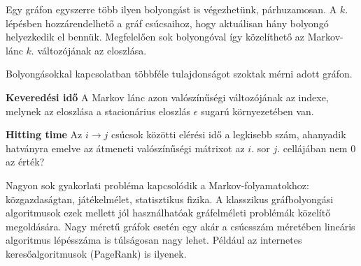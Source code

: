 Egy gráfon egyszerre több ilyen bolyongást is végezhetünk, párhuzamosan. A
$k.$ lépésben hozzárendelhető a gráf csúcsaihoz, hogy aktuálisan hány bolyongó
helyezkedik el bennük. Megfelelően sok bolyongóval így közelíthető az Markov-lánc
$k.$ változójának az eloszlása.

Bolyongásokkal kapcsolatban többféle tulajdonságot szoktak mérni adott gráfon.

\textbf{Keveredési idő} A Markov lánc azon valószínűségi változójának
az indexe, melynek az eloszlása a stacionárius eloszlás $\epsilon$ sugarú környezetében
van.

\textbf{Hitting time} Az $i \rightarrow j$ csúcsok
közötti elérési idő a legkisebb szám, ahanyadik hatványra emelve az
átmeneti valószínűségi mátrixot az $i.$ sor $j.$ cellájában nem 0 az érték?

Nagyon sok gyakorlati probléma kapcsolódik a Markov-folyamatokhoz:
közgazdaságtan, játékelmélet, statisztikus fizika. A klasszikus gráfbolyongási
algoritmusok ezek mellett jól használhatóak gráfelméleti problémák közelítő
megoldására. Nagy méretű gráfok esetén egy akár a csúcsszám méretében lineáris
algoritmus lépésszáma is túlságosan nagy lehet. Például az internetes
keresőalgoritmusok (PageRank) is ilyenek.

